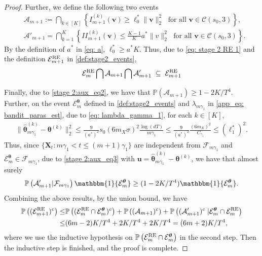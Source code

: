 \documentclass[aos,preprint]{imsart}
\theoremstyle{plain}
\theoremstyle{definition}
\newcommand{\btheta}{\boldsymbol{\theta}}
\newcommand{\hbtheta}{\widehat{\boldsymbol{\theta}}}
\newcommand{\idf}{\mathbbm{1}}
\newcommand{\bX}{\boldsymbol{X}}
\newcommand{\bu}{\boldsymbol{u}}
\newcommand{\bv}{\boldsymbol{v}}
\newcommand{\mE}{\mathcal{E}}
\newcommand{\cF}{\mathcal{F}}
\newcommand{\Pro}{\mathbb{P}}
\begin{document}
\begin{appendix}
\begin{proof}
Further, we define the following two events
\begin{align*}
 &\mathcal{A}_{m+1} := \bigcap_{k \in [K]} \left\{ I_{m+1}^{(k)}(\bv) \geq \ell_0^* \|\bv\|_2^2 \; \text{ for all } 
\bv\in \mathcal{C}(s_0,3)\right\},\\
& \mathcal{A}'_{m+1}=\bigcap_{k = 1}^{K}\left\{ II_{m+1}^{(k)}(\bv) \leq  \frac{K-1}{K} a^*\|v\|_2^2\; \text{ for all } 
\bv\in \mathcal{C}(s_0,3)
\right\}.
\end{align*}
By the definition of $a^*$ in \eqref{eq: a}, $\ell_0^* \geq a^* K$. Thus, due to \eqref{eq: stage 2 RE 1} and the definition $\mE_{m+1}^{\textup{RE}}$ in \eqref{def:stage2_events},
$$\mE_{m}^{\textup{RE}} \bigcap
\mathcal{A}_{m+1} \bigcap \mathcal{A}'_{m+1}
\;\subseteq\; \mE_{m+1}^{\textup{RE}} 
$$


Finally, due to \eqref{stage 2:aux_eq2}, we have that $\Pro\left(\mathcal{A}_{m+1}\right) \geq 1 -2K/T^4$. Further, on the event $\mE_m^{\btheta}$ defined in \eqref{def:stage2_events} and $\lambda_{m\gamma_1}$ in \eqref{app_eq: bandit_paras_est}, due to \eqref{eq: lambda_gamma_1}, for each $k \in [K]$,
\begin{align*}
  \|\hbtheta_{m\gamma_1}^{(k)}-\btheta^{(k)}\|_2^2\le \frac{9}{(a^*)^2} s_0 (6m_X \sigma)^2 \frac{\log(dT)}{m \gamma_1} \leq \frac{9}{(a^*)^2} \frac{(6m_X)^2}{C_{\gamma_1}} \leq (\ell_1^*)^2.
\end{align*}
Thus, since $\{\bX_t: m\gamma_1 < t \leq (m+1)\gamma_1\}$ are independent from $\cF_{m\gamma_1}$ and $\mE_m^{\btheta} \in \cF_{m\gamma_1}$, due to \eqref{stage 2:aux_eq3} with $\bu =\hbtheta_{m\gamma_1}^{(k)}-\btheta^{(k)}$, we have that almost surely
\begin{align*}
    \Pro\left(\mathcal{A}'_{m+1} \vert \cF_{m\gamma_1} \right) \idf\{\mE_m^{\btheta}\}  \geq (1 - 2K/T^4)\idf\{\mE_m^{\btheta}\}.
\end{align*}
Combining the above results, by the union bound, we have
\begin{align*}
    \Pro\left((\mE_{m+1}^{\textup{RE}})^c\right) 
    \leq &\Pro\left( (\mE_{m}^{\textup{RE}} \cap \mE_{m}^{\btheta})^c\right)   
    +\Pro\left((\mathcal{A}_{m+1})^c\right) 
    +\Pro\left((\mathcal{A}'_{m+1})^c\; \vert    \mE_{m}^{\btheta} \cap \mE_{m}^{\textup{RE}}\right)   \\
    \leq & (6m - 2)K/T^4 + 2K/T^4 + 2K/T^4 = (6m+2)K/T^4, 
\end{align*}
where we use the inductive hypothesis on $ \Pro\left(\mE_{m}^{\textup{RE}} \cap \mE_{m}^{\btheta}\right)$ in the second step. Then the inductive step is finished, and the proof is complete.
\end{proof}



\end{appendix}
\end{document}
